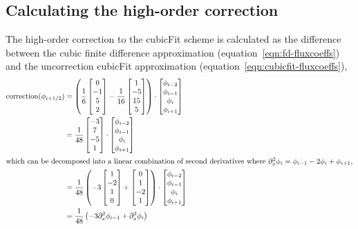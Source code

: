 \documentclass{article}
\begin{document}
\subsection*{Calculating the high-order correction}
The high-order correction to the cubicFit scheme is calculated as the difference between the cubic finite difference approximation (equation~\ref{eqn:fd-fluxcoeffs}) and the uncorrection cubicFit approximation (equation~\ref{eqn:cubicfit-fluxcoeffs}),
\begin{align}
	\mathrm{correction}(\phi_{i+1/2})
	&=
	\left(
	\frac{1}{6} 
	\begin{bmatrix}
		0 \\ -1 \\ 5 \\ 2
	\end{bmatrix}
	-
	\frac{1}{16}
	\begin{bmatrix}
		1 \\ -5 \\ 15 \\ 5
	\end{bmatrix}
	\right)
	\cdot
	\begin{bmatrix}
		\phi_{i-2} \\
		\phi_{i-1} \\
		\phi_i \\
		\phi_{i+1}
	\end{bmatrix} \\
	&=
	\frac{1}{48}
	\begin{bmatrix}
		-3 \\ 7 \\ -5 \\ 1
	\end{bmatrix}
	\cdot
	\begin{bmatrix}
		\phi_{i-2} \\
		\phi_{i-1} \\
		\phi_i \\
		\phi_{i+1}
	\end{bmatrix} \\
%
\intertext{which can be decomposed into a linear combination of second derivatives where $\partial_x^2 \phi_i = \phi_{i-1} - 2 \phi_i + \phi_{i+1}$,}
%
	&=
	\frac{1}{48} \left(
	-3 \begin{bmatrix}1 \\ -2 \\ 1 \\ 0\end{bmatrix}
	+ \begin{bmatrix}0 \\ 1 \\ -2 \\ 1\end{bmatrix}
	\right)
	\cdot
	\begin{bmatrix}
		\phi_{i-2} \\
		\phi_{i-1} \\
		\phi_i \\
		\phi_{i+1}
	\end{bmatrix} \\
	&=
	\frac{1}{48}
	\left( -3 \partial_x^2 \phi_{i-1} + \partial_x^2 \phi_i \right)
\end{align}
\end{document}
